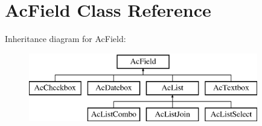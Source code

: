 \hypertarget{class_ac_field}{\section{\-Ac\-Field \-Class \-Reference}
\label{class_ac_field}
}
\-Inheritance diagram for \-Ac\-Field\-:\begin{figure}[H]
\begin{center}
\leavevmode
\includegraphics[height=3.000000cm]{class_ac_field}
\end{center}
\end{figure}
